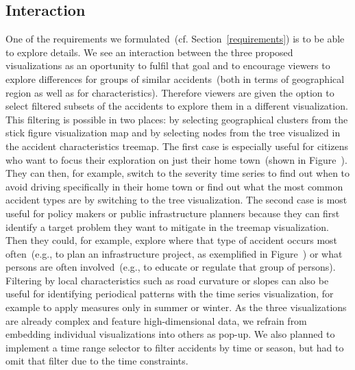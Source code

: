 \subsection{Interaction}
\label{interaction}
One of the requirements we formulated~(cf. Section~\ref{requirements}) is to be able to explore details. 
We see an interaction between the three proposed visualizations as an oportunity to fulfil that goal and to encourage viewers to explore differences for groups of similar accidents~(both in terms of geographical region as well as for characteristics).
Therefore viewers are given the option to select filtered subsets of the accidents to explore them in a different visualization.
This filtering is possible in two places: \Ni by selecting geographical clusters from the stick figure visualization map and \Nii by selecting nodes from the tree visualized in the accident characteristics treemap.
The first case is especially useful for citizens who want to focus their exploration on just their home town~(shown in Figure~). They can then, for example, switch to the severity time series to find out when to avoid driving specifically in their home town or find out what the most common accident types are by switching to the tree visualization. The second case is most useful for policy makers or public infrastructure planners because they can first identify a target problem they want to mitigate in the treemap visualization. Then they could, for example, explore where that type of accident occurs most often~(e.g., to plan an infrastructure project, as exemplified in Figure~) or what persons are often involved~(e.g., to educate or regulate that group of persons). Filtering by local characteristics such as road curvature or slopes can also be useful for identifying periodical patterns with the time series visualization, for example to apply measures only in summer or winter.
As the three visualizations are already complex and feature high-dimensional data, we refrain from embedding individual visualizations into others as pop-up.
We also planned to implement a time range selector to filter accidents by time or season, but had to omit that filter due to the time constraints.
